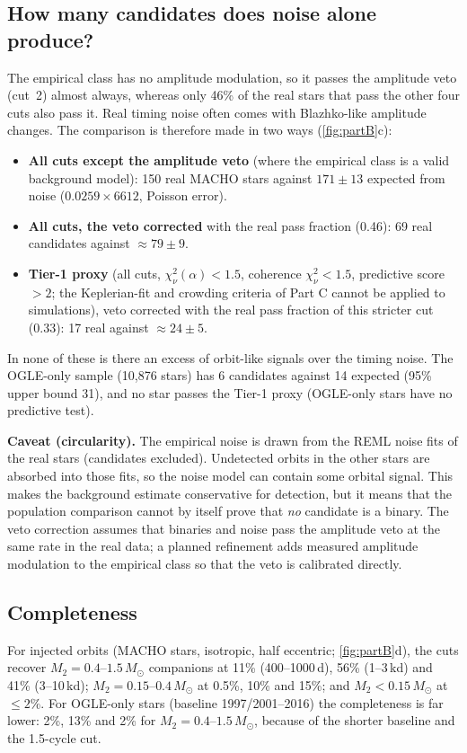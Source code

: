 \documentclass[11pt]{article}
\newcommand{\Msun}{\ensuremath{M_\odot}}
\begin{document}
\subsection{How many candidates does noise alone produce?}
The empirical class has no amplitude modulation, so it passes the amplitude veto (cut~2) almost always, whereas only 46\% of
the real stars that pass the other four cuts also pass it. Real timing noise often comes with Blazhko-like amplitude
changes. The comparison is therefore made in two ways (\cref{fig:partB}c):
\begin{itemize}[leftmargin=*]
\item \textbf{All cuts except the amplitude veto} (where the empirical class is a valid background model): 150 real MACHO
stars against $171\pm13$ expected from noise ($0.0259\times6612$, Poisson error).
\item \textbf{All cuts, the veto corrected} with the real pass fraction (0.46): 69 real candidates against $\approx79\pm9$.
\item \textbf{Tier-1 proxy} (all cuts, $\chi^2_\nu(\alpha)<1.5$, coherence $\chi^2_\nu<1.5$, predictive score $>2$; the
Keplerian-fit and crowding criteria of Part C cannot be applied to simulations), veto corrected with the real pass fraction
of this stricter cut (0.33): 17 real against $\approx24\pm5$.
\end{itemize}
In none of these is there an excess of orbit-like signals over the timing noise. The OGLE-only sample (10{,}876 stars) has 6
candidates against 14 expected (95\% upper bound 31), and no star passes the Tier-1 proxy (OGLE-only stars have no predictive test).

\textbf{Caveat (circularity).} The empirical noise is drawn from the REML noise fits of the real stars (candidates excluded).
Undetected orbits in the other stars are absorbed into those fits, so the noise model can contain some orbital signal. This
makes the background estimate conservative for detection, but it means that the population comparison cannot by itself prove
that \emph{no} candidate is a binary. The veto correction assumes that binaries and noise pass the amplitude veto at the same
rate in the real data; a planned refinement adds measured amplitude modulation to the empirical class so that the veto is
calibrated directly.

\subsection{Completeness}
For injected orbits (MACHO stars, isotropic, half eccentric; \cref{fig:partB}d), the cuts recover $M_2=0.4$--$1.5\,\Msun$
companions at 11\% (400--1000\,d), 56\% (1--3\,kd) and 41\% (3--10\,kd); $M_2=0.15$--$0.4\,\Msun$ at 0.5\%, 10\% and 15\%; and
$M_2<0.15\,\Msun$ at $\le2\%$. For OGLE-only stars (baseline 1997/2001--2016) the completeness is far lower: 2\%, 13\% and 2\%
for $M_2=0.4$--$1.5\,\Msun$, because of the shorter baseline and the 1.5-cycle cut.
\end{document}
